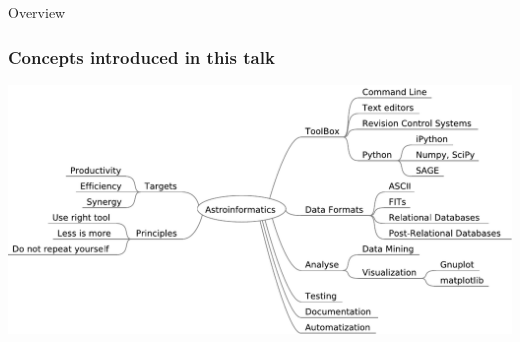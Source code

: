 \documentclass[fleqn]{beamer}
\begin{document}
\begin{section}{Overview}
\begin{frame}\frametitle{Concepts introduced in this talk}
  \begin{center}
    \includegraphics[width=1.0\textwidth]{overview}    
  \end{center}
\end{frame}
\end{section}



\end{document}
